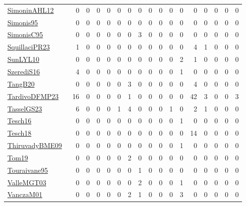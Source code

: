{\begin{longtable}{l*{16}{r}}
\href{papers/SimoninAHL12.pdf}{SimoninAHL12}~\cite{SimoninAHL12} & 0 & 0 & 0 & 0 & 0 & 0 & 0 & 0 & 0 & 0 & 0 & 0 & 0 & 0 & 0 & 0\\
\href{papers/Simonis95.pdf}{Simonis95}~\cite{Simonis95} & 0 & 0 & 0 & 0 & 0 & 0 & 0 & 0 & 0 & 0 & 0 & 0 & 0 & 0 & 0 & 0\\
\href{papers/SimonisC95.pdf}{SimonisC95}~\cite{SimonisC95} & 0 & 0 & 0 & 0 & 0 & 0 & 3 & 0 & 0 & 0 & 0 & 0 & 0 & 0 & 0 & 0\\
\href{papers/SquillaciPR23.pdf}{SquillaciPR23}~\cite{SquillaciPR23} & 1 & 0 & 0 & 0 & 0 & 0 & 0 & 0 & 0 & 0 & 0 & 4 & 1 & 0 & 0 & 0\\
\href{papers/SunLYL10.pdf}{SunLYL10}~\cite{SunLYL10} & 0 & 0 & 0 & 0 & 0 & 0 & 0 & 0 & 0 & 0 & 2 & 1 & 0 & 0 & 0 & 0\\
\href{papers/SzerediS16.pdf}{SzerediS16}~\cite{SzerediS16} & 4 & 0 & 0 & 0 & 0 & 0 & 0 & 0 & 0 & 0 & 1 & 0 & 0 & 0 & 0 & 0\\
\href{papers/TangB20.pdf}{TangB20}~\cite{TangB20} & 0 & 0 & 0 & 0 & 0 & 3 & 0 & 0 & 0 & 0 & 0 & 4 & 0 & 0 & 0 & 0\\
\href{papers/TardivoDFMP23.pdf}{TardivoDFMP23}~\cite{TardivoDFMP23} & 16 & 0 & 0 & 0 & 0 & 1 & 0 & 0 & 0 & 0 & 0 & 42 & 3 & 0 & 0 & 3\\
\href{papers/TasselGS23.pdf}{TasselGS23}~\cite{TasselGS23} & 6 & 0 & 0 & 0 & 1 & 4 & 0 & 0 & 0 & 1 & 0 & 2 & 1 & 0 & 0 & 0\\
\href{papers/Tesch16.pdf}{Tesch16}~\cite{Tesch16} & 0 & 0 & 0 & 0 & 0 & 0 & 0 & 0 & 0 & 0 & 1 & 0 & 0 & 0 & 0 & 0\\
\href{papers/Tesch18.pdf}{Tesch18}~\cite{Tesch18} & 0 & 0 & 0 & 0 & 0 & 0 & 0 & 0 & 0 & 0 & 0 & 14 & 0 & 0 & 0 & 0\\
\href{papers/ThiruvadyBME09.pdf}{ThiruvadyBME09}~\cite{ThiruvadyBME09} & 0 & 0 & 0 & 0 & 0 & 0 & 0 & 0 & 0 & 0 & 1 & 0 & 0 & 0 & 0 & 0\\
\href{papers/Tom19.pdf}{Tom19}~\cite{Tom19} & 0 & 0 & 0 & 0 & 0 & 2 & 0 & 0 & 0 & 0 & 0 & 0 & 0 & 0 & 0 & 0\\
\href{papers/Touraivane95.pdf}{Touraivane95}~\cite{Touraivane95} & 0 & 0 & 0 & 0 & 0 & 0 & 1 & 0 & 0 & 0 & 0 & 0 & 0 & 0 & 0 & 0\\
\href{papers/ValleMGT03.pdf}{ValleMGT03}~\cite{ValleMGT03} & 0 & 0 & 0 & 0 & 0 & 0 & 2 & 0 & 0 & 0 & 1 & 0 & 0 & 0 & 0 & 0\\
\href{papers/VanczaM01.pdf}{VanczaM01}~\cite{VanczaM01} & 0 & 0 & 0 & 0 & 0 & 2 & 1 & 0 & 0 & 0 & 3 & 0 & 0 & 0 & 0 & 0\\

\end{longtable}}
